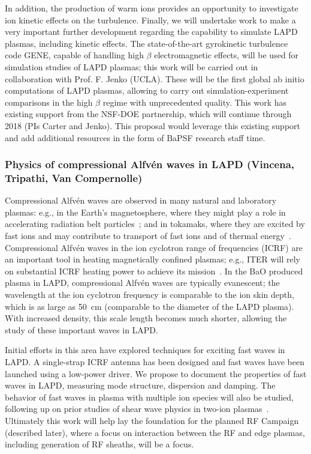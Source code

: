 \documentclass[11pt]{article}
\newcommand\Alfven{Alfv\'en }
\renewcommand{\cite}{\citep}
\begin{document}
In addition, the production of warm ions provides an opportunity to
investigate ion kinetic effects on the turbulence.  Finally, we will
undertake work to make a very important further development regarding
the capability to simulate LAPD plasmas, including kinetic
effects. The state-of-the-art gyrokinetic turbulence code GENE,
capable of handling high $\beta$ electromagnetic effects, will be used
for simulation studies of LAPD plasmas; this work will be carried out
in collaboration with Prof. F. Jenko (UCLA). These will be the first
global ab initio computations of LAPD plasmas, allowing to carry out
simulation-experiment comparisons in the high $\beta$ regime with
unprecedented quality.  This work has existing support from the
NSF-DOE partnership, which will continue through 2018 (PIs Carter and Jenko). This proposal would
leverage this existing support and add additional resources in the
form of BaPSF research staff time.


\subsubsection{Physics of compressional \Alfven waves in LAPD (Vincena, Tripathi,
Van Compernolle)}

Compressional \Alfven waves are observed in many natural and
laboratory plasmas: e.g., in the Earth's magnetosphere, where they
might play a role in accelerating radiation belt particles~\cite{horne:2007}; and in
tokamaks, where they are excited by fast ions and may contribute to
transport of fast ions and of thermal energy~\cite{gorelenkov:2010}. Compressional
\Alfven waves in the ion cyclotron range of frequencies (ICRF) are an
important tool in heating
magnetically confined plasmas; e.g., ITER will rely on substantial
ICRF heating power to achieve its mission~\cite{jaeger:2008}.
In the BaO produced plasma in LAPD, compressional \Alfven waves are
typically evanescent; the wavelength at the ion cyclotron frequency is
comparable to the ion skin depth, which is as large as 50~cm (comparable
to the diameter of the LAPD plasma).  With increased density, this
scale length becomes much shorter, allowing the study of these
important waves in LAPD.  

Initial efforts in this area have explored techniques for exciting
fast waves in LAPD.  A single-strap ICRF antenna has been designed and
fast waves have been launched using a low-power driver.  We propose to
document the properties of fast waves in LAPD, measuring mode
structure, dispersion and damping.  The behavior of fast waves in
plasma with multiple ion species will also be studied, following up on
prior studies of shear wave physics in two-ion
plasmas~\cite{vincena:2010,vincena:2011}.  Ultimately this work will
help lay the foundation for the planned RF Campaign (described later),
where a focus on interaction between the RF and edge plasmas,
including generation of RF sheaths, will be a focus.
\end{document}
